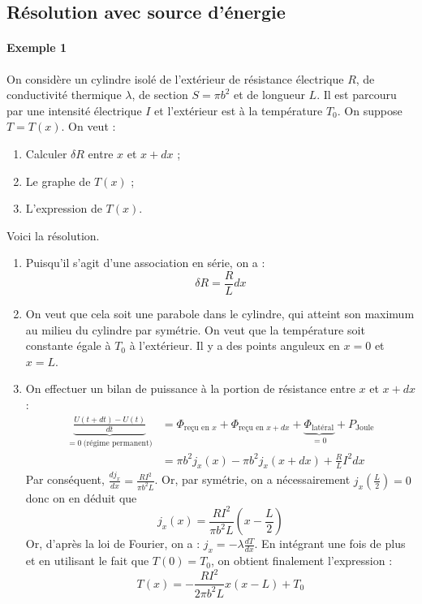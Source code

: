 \documentclass[french]{book}
\theoremstyle{plain}
\theoremstyle{definition}
\theoremstyle{remark}
\begin{document}
\subsection{Résolution avec source d'énergie}

\paragraph{Exemple 1} On considère un cylindre isolé de l'extérieur de résistance électrique $R$, de conductivité thermique $\lambda$, de section $S=\pi b^2$ et de longueur $L$. Il est parcouru par une intensité électrique $I$ et l'extérieur est à la température $T_0$. On suppose $T=T(x)$. On veut :
\begin{enumerate}
	\item Calculer $\delta R$ entre $x$ et $x+dx$ ;
	\item Le graphe de $T(x)$ ;
	\item L'expression de $T(x)$.
\end{enumerate}
Voici la résolution.
\begin{enumerate}
	\item Puisqu'il s'agit d'une association en série, on a : $$\delta R=\frac{R}{L}dx$$
	\item On veut que cela soit une parabole dans le cylindre, qui atteint son maximum au milieu du cylindre par symétrie. On veut que la température soit constante égale à $T_0$ à l'extérieur. Il y a des points anguleux en $x=0$ et $x=L$.
	\item On effectuer un bilan de puissance à la portion de résistance entre $x$ et $x+dx$ :\begin{align*}
		 \underbrace{\frac{U(t+dt)-U(t)}{dt}}_{=0 \ \text{(régime permanent)}}&=\Phi_{\text{reçu en }x}+\Phi_{\text{reçu en }x+dx}+\underbrace{\Phi_\text{latéral}}_{=0}+P_\text{Joule} \\
		 &= \pi b^2j_x(x)-\pi b^2j_x(x+dx)+\frac{R}{L}I^2dx
	\end{align*} Par conséquent, $\displaystyle\frac{dj_x}{dx}=\frac{RI^2}{\pi b^2L}$. Or, par symétrie, on a nécessairement $j_x\displaystyle\left(\frac{L}{2}\right)=0$ donc on en déduit que $$j_x(x)=\frac{RI^2}{\pi b^2L}\left(x-\frac{L}{2}\right)$$ Or, d'après la loi de Fourier, on a : $j_x=\displaystyle -\lambda\frac{dT}{dx}$. En intégrant une fois de plus et en utilisant le fait que $T(0)=T_0$, on obtient finalement l'expression : $$T(x)=-\frac{RI^2}{2\pi b^2L}x(x-L)+T_0$$
\end{enumerate}
\end{document}
